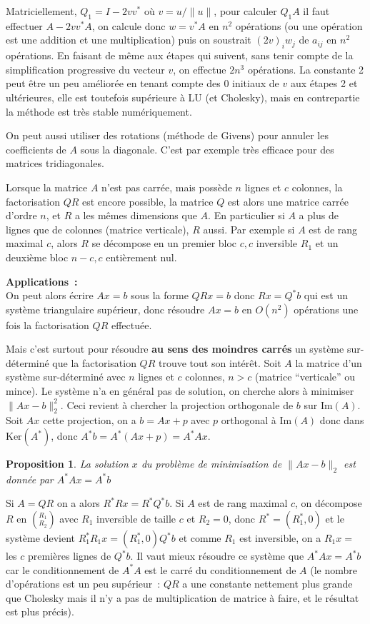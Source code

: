 \documentclass[a4paper,11pt]{book}
\newtheorem{prop}[thm]{Proposition}
\begin{document}
\begin{giacjshere}
Matriciellement, $Q_1=I-2vv^*$ o\`u $v=u/\|u\|$, pour calculer $Q_1A$
il faut effectuer $A-2vv^*A$, on calcule donc $w=v^*A$ en $n^2$
op\'erations (ou une op\'eration est une addition et une
multiplication) puis on soustrait $(2v)_i w_j$ de $a_{ij}$ en $n^2$
op\'erations. En faisant de m\^eme aux \'etapes qui suivent, sans
tenir compte de la simplification progressive du vecteur $v$, on 
effectue $2n^3$ op\'erations. La constante 2 peut \^etre 
un peu am\'elior\'ee en tenant compte des 0 initiaux de $v$ aux
\'etapes 2 et ult\'erieures, elle est toutefois sup\'erieure \`a LU
(et Cholesky), mais en contrepartie
la m\'ethode est tr\`es stable num\'eriquement.

On peut aussi utiliser des rotations (m\'ethode de Givens) pour
annuler les coefficients de $A$ sous la diagonale. C'est par exemple
tr\`es efficace pour des matrices tridiagonales.

Lorsque la matrice $A$ n'est pas carr\'ee, mais poss\`ede $n$ lignes
et $c$ colonnes, la factorisation $QR$ est encore possible, la matrice
$Q$ est alors une matrice carr\'ee d'ordre $n$, et $R$ a les m\^emes
dimensions que $A$. En particulier si $A$ a plus de lignes que de
colonnes (matrice verticale), $R$ aussi. Par exemple si $A$ est de 
rang maximal $c$, alors $R$ se d\'ecompose en un premier bloc
$c,c$ inversible $R_1$ et un deuxi\`eme bloc $n-c,c$ enti\`erement nul.

{\bf Applications~:}\\
On peut alors écrire $Ax=b$ sous la forme $QRx=b$
donc $Rx=Q^*b$ qui est un système triangulaire supérieur,
donc résoudre $Ax=b$ en $O(n^2)$ opérations une fois 
la factorisation $QR$ effectu\'ee.\\

Mais c'est surtout pour résoudre {\bf au sens des moindres carrés}
un système sur-déterminé que la factorisation $QR$ trouve tout
son intérêt. Soit $A$ la matrice d'un syst\`eme sur-d\'etermin\'e
avec $n$ lignes et $c$ colonnes, $n>c$ (matrice ``verticale'' ou mince).
Le syst\`eme n'a en g\'en\'eral pas de solution, on cherche alors
\`a minimiser $\| Ax-b \|_2^2$. Ceci revient \`a
chercher la projection orthogonale de $b$ sur Im$(A)$.
Soit $Ax$ cette projection, on a $b=Ax+p$ avec $p$ orthogonal
\`a Im$(A)$ donc dans Ker$(A^*)$, donc $A^*b=A^*(Ax+p)=A^*Ax$.
\begin{prop}
La solution $x$ du probl\`eme de minimisation de $\| Ax-b \|_2$
est donn\'ee par $A^*Ax=A^*b$
\end{prop}
Si $A=QR$ on a alors $R^* R x=R^* Q^*b$. Si $A$ est de rang maximal
$c$, on d\'ecompose $R$ en $(^{R_1}_{R_2})$ avec $R_1$ inversible de
taille $c$ et
$R_2=0$, donc $R^*=(R_1^*, 0)$ et le syst\`eme devient $R_1^*R_1x =(R_1^*,0) Q^*b $
et comme $R_1$ est inversible, on a $R_1x=$ les $c$ premi\`eres lignes
de $Q^*b$.
Il vaut mieux résoudre ce syst\`eme que $A^* Ax=A^*b$ car
le conditionnement de $A^* A$ est le carré du conditionnement
de $A$ (le nombre d'opérations est un peu sup\'erieur~:
$QR$ a une constante nettement plus grande que Cholesky mais
il n'y a pas de multiplication de matrice \`a faire, et le résultat
est plus précis).


\end{giacjshere}
\end{document}
